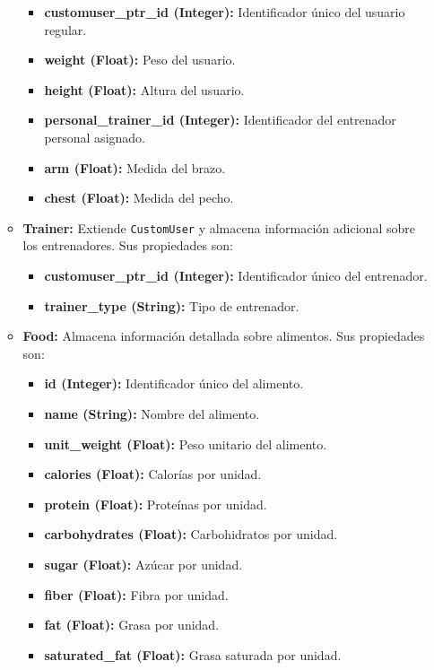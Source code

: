 \begin{itemize}
\begin{itemize}
        \begin{itemize}
            \item \textbf{customuser\_ptr\_id (Integer):} Identificador único del usuario regular.
            \item \textbf{weight (Float):} Peso del usuario.
            \item \textbf{height (Float):} Altura del usuario.
            \item \textbf{personal\_trainer\_id (Integer):} Identificador del entrenador personal asignado.
            \item \textbf{arm (Float):} Medida del brazo.
            \item \textbf{chest (Float):} Medida del pecho.
        \end{itemize}
        \item \textbf{Trainer:} Extiende \texttt{CustomUser} y almacena información adicional sobre los entrenadores. Sus propiedades son:
        \begin{itemize}
            \item \textbf{customuser\_ptr\_id (Integer):} Identificador único del entrenador.
            \item \textbf{trainer\_type (String):} Tipo de entrenador.
        \end{itemize}
        \item \textbf{Food:} Almacena información detallada sobre alimentos. Sus propiedades son:
        \begin{itemize}
            \item \textbf{id (Integer):} Identificador único del alimento.
            \item \textbf{name (String):} Nombre del alimento.
            \item \textbf{unit\_weight (Float):} Peso unitario del alimento.
            \item \textbf{calories (Float):} Calorías por unidad.
            \item \textbf{protein (Float):} Proteínas por unidad.
            \item \textbf{carbohydrates (Float):} Carbohidratos por unidad.
            \item \textbf{sugar (Float):} Azúcar por unidad.
            \item \textbf{fiber (Float):} Fibra por unidad.
            \item \textbf{fat (Float):} Grasa por unidad.
            \item \textbf{saturated\_fat (Float):} Grasa saturada por unidad.

\end{itemize}
\end{itemize}
\end{itemize}
